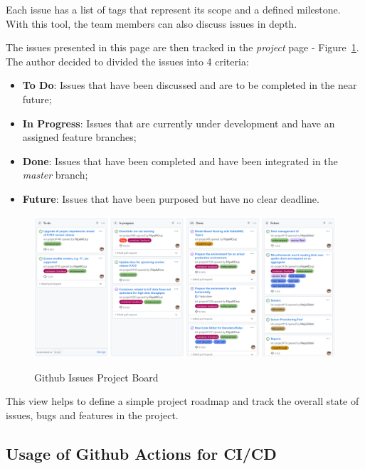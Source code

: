 Each issue has a list of tags that represent its scope and a defined milestone. With this tool, the team members can also discuss issues in depth. 

The issues presented in this page are then tracked in the \textit{project} page - Figure~\ref{fig:implementation:decisions:issues:project}. The author decided to divided the issues into 4 criteria:

\begin{itemize}
    \item \textbf{To Do}: Issues that have been discussed and are to be completed in the near future; 
    \item \textbf{In Progress}: Issues that are currently under development and have an assigned feature branches;
    \item \textbf{Done}: Issues that have been completed and have been integrated in the \textit{master} branch; 
    \item \textbf{Future}: Issues that have been purposed but have no clear deadline.
\end{itemize}

\begin{figure}[H]
    \centering
    \resizebox{\columnwidth}{!}
    {
       \includegraphics{assets/figures/github.png}
    }
    \caption[Github Issues Project Board]{Github Issues Project Board}
    \label{fig:implementation:decisions:issues:project}
\end{figure}

This view helps to define a simple project roadmap and track the overall state of issues, bugs and features in the project.

\subsection{Usage of Github Actions for CI/CD}
\label{subsec:implementation:decisions:actions}

